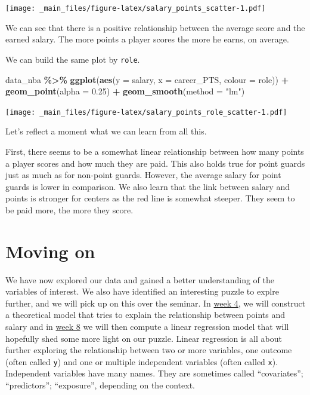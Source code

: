 \documentclass[
]{book}
\newenvironment{Shaded}{\begin{snugshade}}{\end{snugshade}}
\newcommand{\AttributeTok}[1]{\textcolor[rgb]{0.13,0.29,0.53}{#1}}
\newcommand{\FloatTok}[1]{\textcolor[rgb]{0.00,0.00,0.81}{#1}}
\newcommand{\FunctionTok}[1]{\textcolor[rgb]{0.13,0.29,0.53}{\textbf{#1}}}
\newcommand{\NormalTok}[1]{#1}
\newcommand{\SpecialCharTok}[1]{\textcolor[rgb]{0.81,0.36,0.00}{\textbf{#1}}}
\newcommand{\StringTok}[1]{\textcolor[rgb]{0.31,0.60,0.02}{#1}}
\begin{document}
\texttt{[image: \_main\_files/figure-latex/salary\_points\_scatter-1.pdf]}

We can see that there is a positive relationship between the average score and the earned salary. The more points a player scores the more he earns, on average.

We can build the same plot by \texttt{role}.

\begin{Shaded}
\begin{Highlighting}[]
\NormalTok{data\_nba }\SpecialCharTok{\%\textgreater{}\%} 
  \FunctionTok{ggplot}\NormalTok{(}\FunctionTok{aes}\NormalTok{(}\AttributeTok{y =}\NormalTok{ salary, }\AttributeTok{x =}\NormalTok{ career\_PTS, }\AttributeTok{colour =}\NormalTok{ role)) }\SpecialCharTok{+}
  \FunctionTok{geom\_point}\NormalTok{(}\AttributeTok{alpha =} \FloatTok{0.25}\NormalTok{) }\SpecialCharTok{+}
  \FunctionTok{geom\_smooth}\NormalTok{(}\AttributeTok{method =} \StringTok{"lm"}\NormalTok{)}
\end{Highlighting}
\end{Shaded}

\texttt{[image: \_main\_files/figure-latex/salary\_points\_role\_scatter-1.pdf]}

Let's reflect a moment what we can learn from all this.

First, there seems to be a somewhat linear relationship between how many points a player scores and how much they are paid. This also holds true for point guards just as much as for non-point guards. However, the average salary for point guards is lower in comparison. We also learn that the link between salary and points is stronger for centers as the red line is somewhat steeper. They seem to be paid more, the more they score.

\hypertarget{moving-on}{%
\section{Moving on}\label{moving-on}}

We have now explored our data and gained a better understanding of the variables of interest. We also have identified an interesting puzzle to explre further, and we will pick up on this over the seminar. In \protect\hyperlink{dags-1}{week 4}, we will construct a theoretical model that tries to explain the relationship between points and salary and in \protect\hyperlink{lin-a}{week 8} we will then compute a linear regression model that will hopefully shed some more light on our puzzle. Linear regression is all about further exploring the relationship between two or more variables, one outcome (often called \texttt{y}) and one or multiple independent variables (often called \texttt{x}). Independent variables have many names. They are sometimes called ``covariates''; ``predictors''; ``exposure'', depending on the context.
\end{document}
